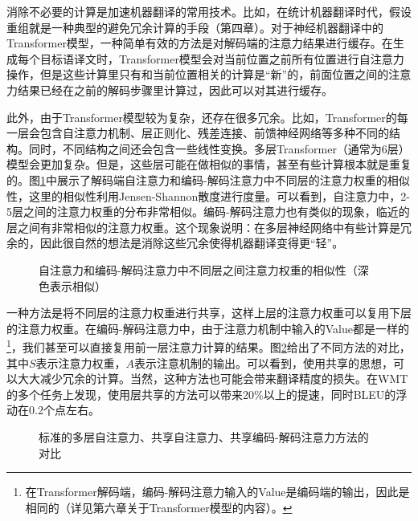 \parinterval 消除不必要的计算是加速机器翻译的常用技术。比如，在统计机器翻译时代，假设重组就是一种典型的避免冗余计算的手段（第四章）。对于神经机器翻译中的Transformer模型，一种简单有效的方法是对解码端的注意力结果进行缓存。在生成每个目标语译文时，Transformer模型会对当前位置之前所有位置进行自注意力操作，但是这些计算里只有和当前位置相关的计算是``新''的，前面位置之间的注意力结果已经在之前的解码步骤里计算过，因此可以对其进行缓存。

\parinterval 此外，由于Transformer模型较为复杂，还存在很多冗余。比如，Transformer的每一层会包含自注意力机制、层正则化、残差连接、前馈神经网络等多种不同的结构。同时，不同结构之间还会包含一些线性变换。多层Transformer（通常为6层）模型会更加复杂。但是，这些层可能在做相似的事情，甚至有些计算根本就是重复的。图\ref{fig:7-21}中展示了解码端自注意力和编码-解码注意力中不同层的注意力权重的相似性，这里的相似性利用Jensen-Shannon散度进行度量\cite{61115}。可以看到，自注意力中，2-5层之间的注意力权重的分布非常相似。编码-解码注意力也有类似的现象，临近的层之间有非常相似的注意力权重。这个现象说明：在多层神经网络中有些计算是冗余的，因此很自然的想法是消除这些冗余使得机器翻译变得更``轻''。

\begin{figure}[htp]
\centering

\caption{自注意力和编码-解码注意力中不同层之间注意力权重的相似性（深色表示相似）}
\label{fig:7-21}
\end{figure}

\parinterval 一种方法是将不同层的注意力权重进行共享，这样上层的注意力权重可以复用下层的注意力权重。在编码-解码注意力中，由于注意力机制中输入的Value都是一样的 \footnote{在Transformer解码端，编码-解码注意力输入的Value是编码端的输出，因此是相同的（详见第六章关于Transformer模型的内容）。}，我们甚至可以直接复用前一层注意力计算的结果。图\ref{fig:7-22}给出了不同方法的对比，其中$S$表示注意力权重，$A$表示注意机制的输出。可以看到，使用共享的思想，可以大大减少冗余的计算。当然，这种方法也可能会带来翻译精度的损失。在WMT的多个任务上发现，使用层共享的方法可以带来20\%以上的提速，同时BLEU的浮动在0.2个点左右\cite{Xiao2019SharingAW}。

\begin{figure}[htp]
\centering

\caption{标准的多层自注意力、共享自注意力、共享编码-解码注意力方法的对比\cite{Xiao2019SharingAW}}
\label{fig:7-22}
\end{figure}

